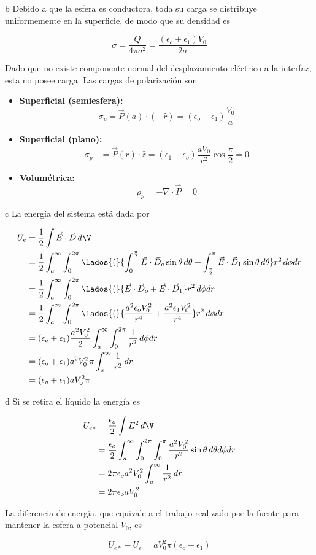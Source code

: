 \ics b
Debido a que la esfera es conductora, toda su carga se distribuye uniformemente en la superficie, de modo que su densidad es

\[\sigma = \frac{Q}{4\pi a^2}
= \frac{(\epsilon_o+\epsilon_1)V_0}{2a}\]

Dado que no existe componente normal del desplazamiento eléctrico a la interfaz, esta no posee carga. Las cargas de polarización son

\begin{itemize}
    \item \textbf{Superficial (semiesfera):}
    \[\sigma_{p} = \Vec{P}(a)\cdot(-\hat{r})
    = (\epsilon_o-\epsilon_1)\frac{V_0}{a}\]
    \item\textbf{Superficial (plano):}
    \[\sigma_{p-}=\Vec{P}(r)\cdot\hat{z}=
    (\epsilon_1-\epsilon_o)\frac{aV_0}{r^2}
    \cos{\frac{\pi}{2}}=0\]
    \item\textbf{Volumétrica:}
    \[\rho_p = -\nabla\cdot\Vec{P} = 0\]
\end{itemize}

\ics c
La energía del sistema está dada por

\begin{equation}
\begin{split}
    U_e &= \frac{1}{2}\int\Vec{E}\cdot\Vec{D}\,d\V\\
    &= \frac{1}{2}\int^\infty_a\int^{2\pi}_0\lados{(}{\int^{\frac{\pi}{2}}_0\Vec{E}\cdot\Vec{D}_o\sin{\theta}\,d\theta+\int^\pi_{\frac{\pi}{2}}\Vec{E}\cdot\Vec{D}_1\sin{\theta}\,d\theta}r^2\,d\phi dr\\
    &= \frac{1}{2}\int^\infty_a\int^{2\pi}_0\lados{(}{\Vec{E}\cdot\Vec{D}_o+\Vec{E}\cdot\Vec{D}_1}r^2\,d\phi dr\\
    &= \frac{1}{2}\int^\infty_a\int^{2\pi}_0\lados{(}{\frac{a^2\epsilon_oV_0^2}{r^4}+\frac{a^2\epsilon_1V_0^2}{r^4}}r^2\,d\phi dr\\
    &= (\epsilon_o+\epsilon_1)\frac{a^2V_0^2}{2}\int^\infty_a\int^{2\pi}_0\frac{1}{r^2}\,d\phi dr\\
    &= (\epsilon_o+\epsilon_1)a^2V_0^2\pi\int^\infty_a\frac{1}{r^2}\,dr\\
    &= (\epsilon_o+\epsilon_1)aV_0^2\pi\\
\end{split}
\nonumber
\end{equation}

\ics d
Si se retira el líquido la energía es

\begin{equation}
\begin{split}
    U_{e*} &= \frac{\epsilon_o}{2}\int E^2\,d\V\\
    &= \frac{\epsilon_o}{2}\int^\infty_a\int^{2\pi}_0\int^\pi_0
    \frac{a^2V_0^2}{r^2}\sin{\theta}\,d\theta d\phi dr\\
    &= 2\pi\epsilon_oa^2V_0^2\int^\infty_a
    \frac{1}{r^2}\, dr\\
    &= 2\pi\epsilon_oaV_0^2\\
\end{split}
\nonumber
\end{equation}

La diferencia de energía, que equivale a el trabajo realizado por la fuente para mantener la esfera a potencial $V_0$, es

\[U_{e*}-U_e = aV_0^2\pi(\epsilon_o-\epsilon_1)\]


\newpage
